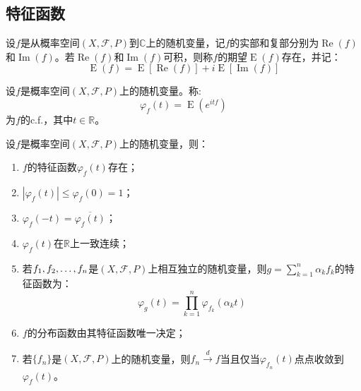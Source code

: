 \subsection{特征函数}
\begin{definition}
	设$f$是从概率空间$(X,\mathscr{F},P)$到$\mathbb{C}$上的随机变量，记$f$的实部和复部分别为$\operatorname{Re}(f)$和$\operatorname{Im}(f)$。若$\operatorname{Re}(f)$和$\operatorname{Im}(f)$可积，则称$f$的期望$\operatorname{E}(f)$存在，并记：
	\begin{equation*}
		\operatorname{E}(f)=\operatorname{E}[\operatorname{Re}(f)]+i\operatorname{E}[\operatorname{Im}(f)]
	\end{equation*}
\end{definition}
\begin{definition}
	设$f$是概率空间$(X,\mathscr{F},P)$上的随机变量。称:
	\begin{equation*}
		\varphi_f(t)=\operatorname{E}(e^{itf})
	\end{equation*}
	为$f$的\gls{c.f.}，其中$t\in\mathbb{R}$。
\end{definition}
\begin{property}\label{prop:CharacteristicFunction}
	设$f$是概率空间$(X,\mathscr{F},P)$上的随机变量，则：
	\begin{enumerate}
		\item $f$的特征函数$\varphi_f(t)$存在；
		\item $|\varphi_f(t)|\leqslant\varphi_f(0)=1$；
		\item $\varphi_f(-t)=\overline{\varphi_f(t)}$；
		\item $\varphi_f(t)$在$\mathbb{R}$上一致连续；
		\item 若$f_1, f_2, \dots, f_{n}$是$(X,\mathscr{F},P)$上相互独立的随机变量，则$g=\sum\limits_{k=1}^n\alpha_kf_k$的特征函数为：
		\begin{equation*}
			\varphi_{g}(t)=\prod_{k=1}^n\varphi_{f_k}(\alpha_kt)
		\end{equation*}
		\item $f$的分布函数由其特征函数唯一决定；
		\item 若$\{f_n\}$是$(X,\mathscr{F},P)$上的随机变量，则$f_n\overset{d}{\longrightarrow}f$当且仅当$\varphi_{f_n}(t)$点点收敛到$\varphi_f(t)$。
	\end{enumerate}
\end{property}
